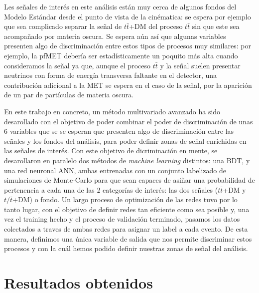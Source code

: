 \documentclass[a4paper, 10pt, openright]{report}
\begin{document}
\begin{appendices}
Les se\~{n}ales de inter\'{e}s en este an\'{a}lisis est\'{a}n muy cerca de algunos fondos del Modelo Est\'{a}ndar desde el punto de vista de la cin\'{e}matica: se espera por ejemplo que sea complicado separar la se\~{n}al de $t \bar t$+DM del proceso $t \bar t$ sin que este sea acompa\~{n}ado por materia oscura. Se espera a\'{u}n as\'{i} que algunas variables presenten algo de discriminaci\'{o}n entre estos tipos de procesos muy similares: por ejemplo, la pf\ac{MET} deber\'{i}a ser estad\'{i}sticamente un poquito m\'{a}s alta cuando consideramos la se\~{n}al ya que, aunque el proceso $t \bar t$ y la se\~{n}al suelen presentar neutrinos con forma de energ\'{i}a transversa faltante en el detector, una contribuci\'{o}n adicional a la \ac{MET} se espera en el caso de la se\~{n}al, por la aparici\'{o}n de un par de part\'{i}culas de materia oscura.

En este trabajo en concreto, un m\'{e}todo multivariado avanzado ha sido desarollado con el objetivo de poder combinar el poder de discriminaci\'{o}n de unas 6 variables que se se esperan que presenten algo de discriminaci\'{o}n entre las se\~{n}ales y los fondos del an\'{a}lisis, para poder definir zonas de se\~{n}al enrichidas en las se\~{n}ales de inter\'{e}s. Con este objetivo de dicriminaci\'{o}n en mente, se desarollaron en paralelo dos m\'{e}todos de \textit{machine learning} distintos: una \ac{BDT}, y una red neuronal \ac{ANN}, ambas entrenadas con un conjunto labelizado de simulaciones de Monte-Carlo para que sean capaces de asi\~{n}ar una probabilidad de pertenencia a cada una de las 2 categor\'{i}as de inter\'{e}s: las dos se\~{n}ales ($t \bar t$+DM y $t/\bar t$+DM) o fondo. Un largo proceso de optimizaci\'{o}n de las redes tuvo por lo tanto lugar, con el objetivo de definir redes tan eficiente como sea posible y, una vez el training hecho y el proceso de validaci\'{o}n terminado, pasamos los datos colectados a traves de ambas redes para asignar un label a cada evento. De esta manera, definimos una \'{u}nica variable de salida que nos permite discriminar estos procesos y con la cu\'{a}l hemos podido definir nuestras zonas de se\~{n}al del an\'{a}lisis.


\section{Resultados obtenidos}








\end{appendices}
\end{document}
